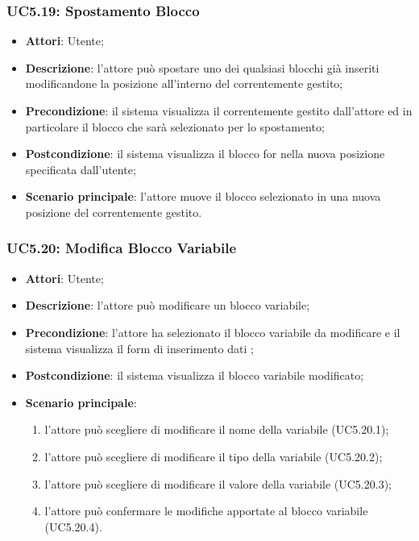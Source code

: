 \subsubsection{UC5.19: Spostamento Blocco}
\label{UC5.19}
\begin{itemize}
\item \textbf{Attori}: Utente;
\item \textbf{Descrizione}: l'attore può spostare uno dei qualsiasi blocchi già inseriti modificandone la posizione all'interno del  correntemente gestito;	
\item \textbf{Precondizione}: il sistema visualizza il  correntemente gestito dall'attore ed in particolare il blocco che sarà selezionato per lo spostamento;	
\item \textbf{Postcondizione}: il sistema visualizza il blocco for nella nuova posizione specificata dall'utente;	
\item \textbf{Scenario principale}:
l'attore muove il blocco selezionato in una nuova posizione del  correntemente gestito.	
\end{itemize}

\subsubsection{UC5.20: Modifica Blocco Variabile}
\label{UC5.20}
\begin{itemize}
\item \textbf{Attori}: Utente;
\item \textbf{Descrizione}: l'attore può modificare un blocco variabile;
\item \textbf{Precondizione}: l'attore ha selezionato il blocco variabile da modificare e il sistema visualizza il form di inserimento dati ;	
\item \textbf{Postcondizione}: il sistema visualizza il blocco variabile modificato;	
\item \textbf{Scenario principale}:
\begin{enumerate}
\item l'attore può scegliere di modificare il nome della variabile (UC5.20.1);
\item l'attore può scegliere di modificare il tipo della variabile (UC5.20.2);
\item l'attore può scegliere di modificare il valore della variabile (UC5.20.3);
\item l'attore può confermare le modifiche apportate al blocco variabile (UC5.20.4).
\end{enumerate}
\end{itemize}

